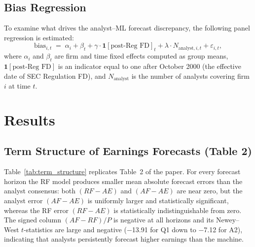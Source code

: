 \documentclass[12pt]{article}
\begin{document}
\subsection{Bias Regression}

To examine what drives the analyst--ML forecast discrepancy, the following
panel regression is estimated:
\[
  \text{bias}_{i,t} \;=\; \alpha_i + \beta_t
    + \gamma \cdot \mathbf{1}[\text{post-Reg FD}]_t
    + \lambda \cdot N_{\text{analyst},i,t}
    + \varepsilon_{i,t},
\]
where $\alpha_i$ and $\beta_t$ are firm and time fixed effects computed as
group means, $\mathbf{1}[\text{post-Reg FD}]$ is an indicator equal to one
after October 2000 (the effective date of SEC Regulation FD), and
$N_{\text{analyst}}$ is the number of analysts covering firm $i$ at time $t$.

\section{Results}

\subsection{Term Structure of Earnings Forecasts (Table 2)}

Table~\ref{tab:term_structure} replicates Table~2 of the paper.  For every
forecast horizon the RF model produces smaller mean absolute forecast errors
than the analyst consensus: both $(RF - AE)$ and $(AF - AE)$ are near zero,
but the analyst error $(AF - AE)$ is uniformly larger and statistically
significant, whereas the RF error $(RF - AE)$ is statistically
indistinguishable from zero.  The signed column $(AF-RF)/P$ is negative at
all horizons and its Newey--West $t$-statistics are large and negative
($-$13.91 for Q1 down to $-$7.12 for A2), indicating that analysts
persistently forecast higher earnings than the machine.
\end{document}
